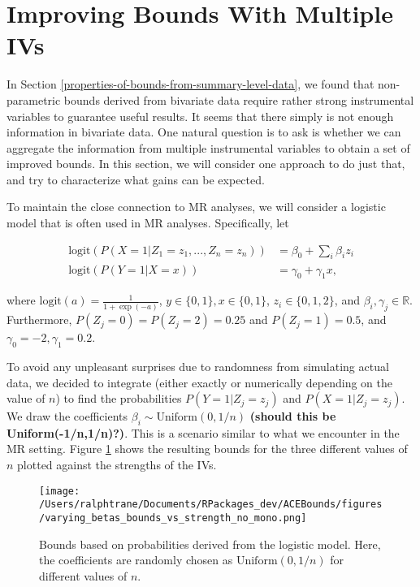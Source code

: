 \documentclass[
]{article}
\theoremstyle{plain}
\begin{document}
\hypertarget{improving-bounds-with-multiple-ivs}{%
\section{Improving Bounds With Multiple IVs}\label{improving-bounds-with-multiple-ivs}}

In Section \ref{properties-of-bounds-from-summary-level-data}, we found that non-parametric bounds derived from bivariate data require rather strong instrumental variables to guarantee useful results. It seems that there simply is not enough information in bivariate data. One natural question is to ask is whether we can aggregate the information from multiple instrumental variables to obtain a set of improved bounds. In this section, we will consider one approach to do just that, and try to characterize what gains can be expected.

To maintain the close connection to MR analyses, we will consider a logistic model that is often used in MR analyses. Specifically, let

\[\begin{aligned}
\text{logit}(P(X = 1 | Z_1 = z_1, ..., Z_n = z_n)) &= \beta_0 + \sum_i \beta_i z_i \\
\text{logit}(P(Y = 1 | X = x)) &= \gamma_0 + \gamma_1 x,
\end{aligned}\]

where \(\text{logit}(a) = \frac{1}{1 + \exp(-a)}\), \(y \in \{0,1\}, x \in \{0,1\}\), \(z_i \in \{0, 1, 2\}\), and \(\beta_i, \gamma_j \in \mathbb{R}\). Furthermore, \(P(Z_j = 0) = P(Z_j = 2) = 0.25\) and \(P(Z_j = 1) = 0.5\), and \(\gamma_0 = -2, \gamma_1 = 0.2\).

To avoid any unpleasant surprises due to randomness from simulating actual data, we decided to integrate (either exactly or numerically depending on the value of \(n\)) to find the probabilities \(P(Y = 1 | Z_j = z_j)\) and \(P(X = 1 | Z_j = z_j)\). We draw the coefficients \(\beta_i \sim \text{Uniform}(0, 1/n)\) \textbf{(should this be Uniform(-1/n,1/n)?)}. This is a scenario similar to what we encounter in the MR setting. Figure \ref{fig:bounds_vs_strength_many_IVs_varying_betas} shows the resulting bounds for the three different values of \(n\) plotted against the strengths of the IVs.

\begin{figure}[!h]
  \center
  \texttt{[image: /Users/ralphtrane/Documents/RPackages\_dev/ACEBounds/figures/varying\_betas\_bounds\_vs\_strength\_no\_mono.png]}
  \caption{Bounds based on probabilities derived from the logistic model. Here, the coefficients are randomly chosen as $\text{Uniform}(0, 1/n)$ for different values of $n$.}  
  \label{fig:bounds_vs_strength_many_IVs_varying_betas}
\end{figure}
\end{document}
